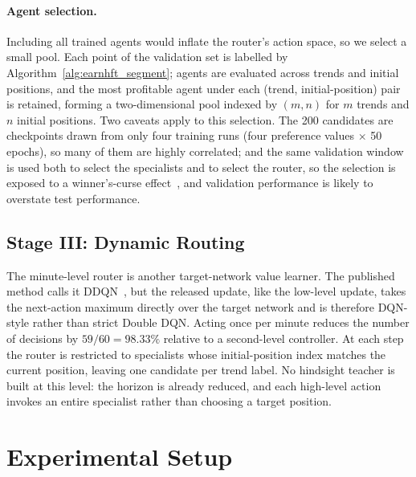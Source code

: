 \paragraph{Agent selection.} Including all trained agents would inflate the router's action space, so we select a small pool. Each point of the validation set is labelled by Algorithm~\ref{alg:earnhft_segment}; agents are evaluated across trends and initial positions, and the most profitable agent under each (trend, initial-position) pair is retained, forming a two-dimensional pool indexed by $(m,n)$ for $m$ trends and $n$ initial positions. Two caveats apply to this selection. The 200 candidates are checkpoints drawn from only four training runs (four preference values $\times$ 50 epochs), so many of them are highly correlated; and the same validation window is used both to select the specialists and to select the router, so the selection is exposed to a winner's-curse effect~\cite{harvey2016cross}, and validation performance is likely to overstate test performance.

\subsection{Stage III: Dynamic Routing}
\label{sec:earnhft_stage3}

The minute-level router is another target-network value learner. The published method calls it DDQN~\cite{van2016deep}, but the released update, like the low-level update, takes the next-action maximum directly over the target network and is therefore DQN-style rather than strict Double DQN. Acting once per minute reduces the number of decisions by $59/60=98.33\%$ relative to a second-level controller. At each step the router is restricted to specialists whose initial-position index matches the current position, leaving one candidate per trend label. No hindsight teacher is built at this level: the horizon is already reduced, and each high-level action invokes an entire specialist rather than choosing a target position.

\section{Experimental Setup}
\label{sec:earnhft_setup}

